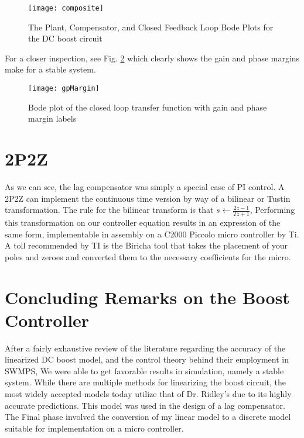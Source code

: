 \begin{figure}[htbp]
\begin{center}
\texttt{[image: composite]}
\caption{The Plant, Compensator, and Closed Feedback Loop Bode Plots for the DC boost circuit}
\label{composite}
\end{center}
\end{figure}

For a closer inspection, see Fig. \ref{gpMargin} which clearly shows the gain and phase margins make for a stable system. 

\begin{figure}[htbp]
\begin{center}
\texttt{[image: gpMargin]}
\caption{Bode plot of the closed loop transfer function with gain and phase margin labels}
\label{gpMargin}
\end{center}
\end{figure}

\section{2P2Z}
As we can see, the lag compensator was simply a special case of PI control. A 2P2Z can implement the continuous time version by way of a bilinear or Tustin transformation. The rule for the bilinear transform is that $s\leftarrow\frac{2z-1}{Tz+1}$, Performing this transformation on our controller equation results in an expression of the same form, implementable in assembly on a C2000 Piccolo micro controller by Ti. A toll recommended by TI is the Biricha tool that takes the placement of your poles and zeroes and converted them to the necessary coefficients for the micro.

\section{Concluding Remarks on the Boost Controller}
After a fairly exhaustive review of the literature regarding the accuracy of the linearized DC boost model, and the control theory behind their employment in SWMPS, We were able to get favorable results in simulation, namely a stable system. While there are multiple methods for linearizing the boost circuit, the most widely accepted models today utilize that of Dr. Ridley's due to its highly accurate predictions. This model was used in the design of a lag compensator. The Final phase involved the conversion of my linear model to a discrete model suitable for implementation on a micro controller.